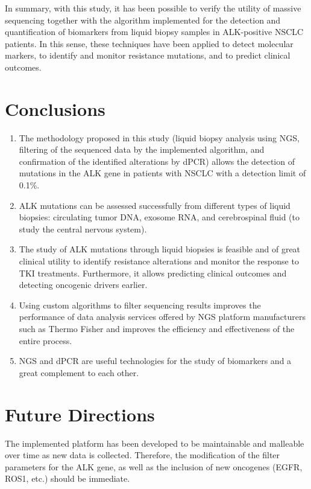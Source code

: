 In summary, with this study, it has been possible to verify the utility of massive sequencing together with the algorithm implemented for the detection and quantification of biomarkers from liquid biopsy samples in ALK-positive NSCLC patients. In this sense, these techniques have been applied to detect molecular markers, to identify and monitor resistance mutations, and to predict clinical outcomes.

\section{Conclusions}

\begin{enumerate}
    \item The methodology proposed in this study (liquid biopsy analysis using NGS, filtering of the sequenced data by the implemented algorithm, and confirmation of the identified alterations by dPCR) allows the detection of mutations in the ALK gene in patients with NSCLC with a detection limit of 0.1\%.
    \item ALK mutations can be assessed successfully from different types of liquid biopsies: circulating tumor DNA, exosome RNA, and cerebrospinal fluid (to study the central nervous system).
    \item The study of ALK mutations through liquid biopsies is feasible and of great clinical utility to identify resistance alterations and monitor the response to TKI treatments. Furthermore, it allows predicting clinical outcomes and detecting oncogenic drivers earlier.
    \item Using custom algorithms to filter sequencing results improves the performance of data analysis services offered by NGS platform manufacturers such as Thermo Fisher and improves the efficiency and effectiveness of the entire process.
    \item NGS and dPCR are useful technologies for the study of biomarkers and a great complement to each other.
\end{enumerate}

\section{Future Directions}

The implemented platform has been developed to be maintainable and malleable over time as new data is collected. Therefore, the modification of the filter parameters for the ALK gene, as well as the inclusion of new oncogenes (EGFR, ROS1, etc.) should be immediate.

